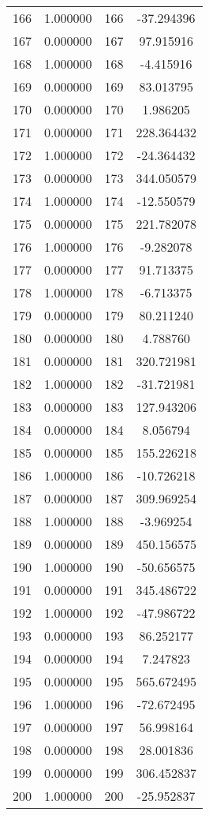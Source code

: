 \documentclass[12pt]{article}
\begin{document}
\begin{longtable}{@{}cccc@{}}
166 & 1.000000 & 166 & -37.294396 \\
167 & 0.000000 & 167 & 97.915916 \\
168 & 1.000000 & 168 & -4.415916 \\
169 & 0.000000 & 169 & 83.013795 \\
170 & 0.000000 & 170 & 1.986205 \\
171 & 0.000000 & 171 & 228.364432 \\
172 & 1.000000 & 172 & -24.364432 \\
173 & 0.000000 & 173 & 344.050579 \\
174 & 1.000000 & 174 & -12.550579 \\
175 & 0.000000 & 175 & 221.782078 \\
176 & 1.000000 & 176 & -9.282078 \\
177 & 0.000000 & 177 & 91.713375 \\
178 & 1.000000 & 178 & -6.713375 \\
179 & 0.000000 & 179 & 80.211240 \\
180 & 0.000000 & 180 & 4.788760 \\
181 & 0.000000 & 181 & 320.721981 \\
182 & 1.000000 & 182 & -31.721981 \\
183 & 0.000000 & 183 & 127.943206 \\
184 & 0.000000 & 184 & 8.056794 \\
185 & 0.000000 & 185 & 155.226218 \\
186 & 1.000000 & 186 & -10.726218 \\
187 & 0.000000 & 187 & 309.969254 \\
188 & 1.000000 & 188 & -3.969254 \\
189 & 0.000000 & 189 & 450.156575 \\
190 & 1.000000 & 190 & -50.656575 \\
191 & 0.000000 & 191 & 345.486722 \\
192 & 1.000000 & 192 & -47.986722 \\
193 & 0.000000 & 193 & 86.252177 \\
194 & 0.000000 & 194 & 7.247823 \\
195 & 0.000000 & 195 & 565.672495 \\
196 & 1.000000 & 196 & -72.672495 \\
197 & 0.000000 & 197 & 56.998164 \\
198 & 0.000000 & 198 & 28.001836 \\
199 & 0.000000 & 199 & 306.452837 \\
200 & 1.000000 & 200 & -25.952837 \\

\end{longtable}
\end{document}
